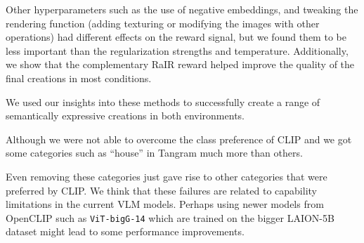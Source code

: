 Other hyperparameters such as the use of negative embeddings, and tweaking the rendering function (adding texturing or modifying the images with other operations) had different effects on the reward signal, but we found them to be less important than the regularization strengths and temperature.
Additionally, we show that the complementary RaIR reward helped improve the quality of the final creations in most conditions.

We used our insights into these methods to successfully create a range of semantically expressive creations in both environments.




Although we were not able to overcome the class preference of CLIP and we got some categories such as ``house'' in Tangram much more than others.



Even removing these categories just gave rise to other categories that were preferred by CLIP.
We think that these failures are related to capability limitations in the current VLM models.
Perhaps using newer models from OpenCLIP such as \texttt{ViT-bigG-14} \citep{openclip} which are trained on the bigger LAION-5B dataset \citep{laion5b} might lead to some performance improvements.

